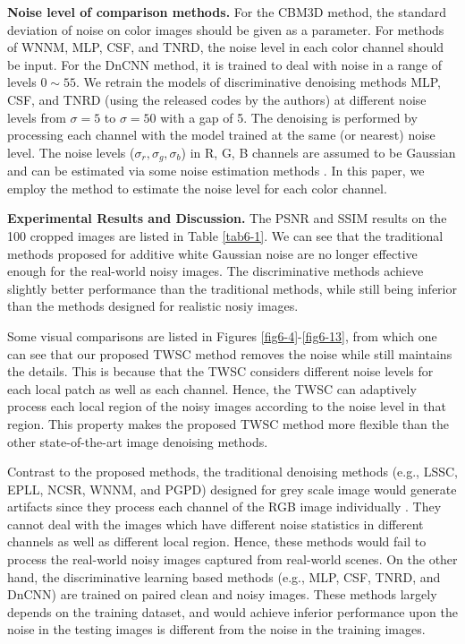 \textbf{Noise level of comparison methods.} For the CBM3D method, the standard deviation of noise on color images should be given as a parameter. For methods of WNNM, MLP, CSF, and TNRD, the noise level in each color channel should be input. For the DnCNN method, it is trained to deal with noise in a range of levels $0\sim55$. We retrain the models of discriminative denoising methods MLP, CSF, and TNRD (using the released codes by the authors) at different noise levels from $\sigma=5$ to $\sigma=50$ with a gap of 5. The denoising is performed by processing each channel with the model trained at the same (or nearest) noise level. The noise levels ($\sigma_{r}, \sigma_{g}, \sigma_{b}$) in R, G, B channels are assumed to be Gaussian and can be estimated via some noise estimation methods \cite{noiselevel,Chen2015ICCV}. In this paper, we employ the method \cite{noiselevel} to estimate the noise level for each color channel.


\textbf{Experimental Results and Discussion.}
The PSNR and SSIM \cite{ssim} results on the 100 cropped images are listed in Table \ref{tab6-1}. We can see that the traditional methods proposed for additive white Gaussian noise are no longer effective enough for the real-world noisy images. The discriminative methods achieve slightly better performance than the traditional methods, while still being inferior than the methods designed for realistic nosiy images.

Some visual comparisons are listed in Figures \ref{fig6-4}-\ref{fig6-13}, from which one can see that our proposed TWSC method removes the noise while still maintains the details. This is because that the TWSC considers different noise levels for each local patch as well as each channel. Hence, the TWSC can adaptively process each local region of the noisy images according to the noise level in that region. This property makes the proposed TWSC method more flexible than the other state-of-the-art image denoising methods. 

Contrast to the proposed methods, the traditional denoising methods (e.g., LSSC, EPLL, NCSR, WNNM, and PGPD) designed for grey scale image would generate artifacts since they process each channel of the RGB image individually \cite{srcolor}. They cannot deal with the images which have different noise statistics in different channels as well as different local region. Hence, these methods would fail to process the real-world noisy images captured from real-world scenes. On the other hand, the discriminative learning based methods (e.g., MLP, CSF, TNRD, and DnCNN) are trained on paired clean and noisy images. These methods largely depends on the training dataset, and would achieve inferior performance upon the noise in the testing images is different from the noise in the training images.

